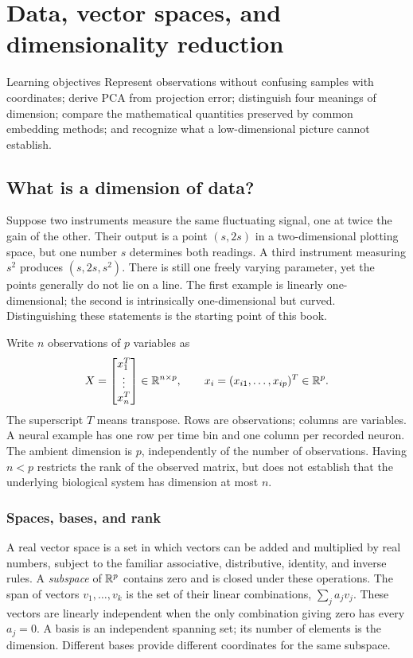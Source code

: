 \chapter{Data, vector spaces, and dimensionality reduction}\label{ch:01}
\begin{insight}{Learning objectives}
Represent observations without confusing samples with coordinates; derive PCA from projection error; distinguish four meanings of dimension; compare the mathematical quantities preserved by common embedding methods; and recognize what a low-dimensional picture cannot establish.
\end{insight}

\section{What is a dimension of data?}
Suppose two instruments measure the same fluctuating signal, one at twice the gain of the other. Their output is a point $(s,2s)$ in a two-dimensional plotting space, but one number $s$ determines both readings. A third instrument measuring $s^2$ produces $(s,2s,s^2)$. There is still one freely varying parameter, yet the points generally do not lie on a line. The first example is linearly one-dimensional; the second is intrinsically one-dimensional but curved. Distinguishing these statements is the starting point of this book.

Write $n$ observations of $p$ variables as
\begin{equation}\label{eq:data-matrix}
X=\begin{bmatrix}x_1^T\\\vdots\\x_n^T\end{bmatrix}\in\mathbb{R}^{n\times p},\qquad
x_i=(x_{i1},\ldots,x_{ip})^T\in\mathbb{R}^p.
\end{equation}
The superscript $T$ means transpose. Rows are observations; columns are variables. A neural example has one row per time bin and one column per recorded neuron. The ambient dimension is $p$, independently of the number of observations. Having $n<p$ restricts the rank of the observed matrix, but does not establish that the underlying biological system has dimension at most $n$.

\subsection{Spaces, bases, and rank}
A real vector space is a set in which vectors can be added and multiplied by real numbers, subject to the familiar associative, distributive, identity, and inverse rules. A \emph{subspace} of $\mathbb{R}^p$ contains zero and is closed under these operations. The span of vectors $v_1,\ldots,v_k$ is the set of their linear combinations, $\sum_j a_jv_j$. These vectors are linearly independent when the only combination giving zero has every $a_j=0$. A basis is an independent spanning set; its number of elements is the dimension. Different bases provide different coordinates for the same subspace.

